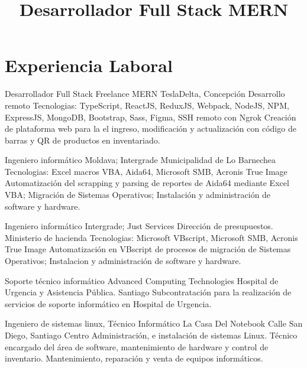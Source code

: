 \documentclass[draft,color,12pt,letterpaper,sans]{moderncv}
\title{Desarrollador Full Stack MERN}
\begin{document}
\makecvtitle %

\section{Experiencia Laboral}
{Desarrollador Full Stack Freelance MERN}
{TeslaDelta, Concepci\'on}
{\newline Desarrollo remoto}
{\newline Tecnologias: TypeScript, ReactJS, ReduxJS, Webpack, NodeJS, NPM, ExpressJS, MongoDB, Bootstrap, Sass, Figma, SSH remoto con Ngrok}
{Creaci\'on de plataforma web para la el ingreso, modificaci\'on y actualizaci\'on con c\'odigo de barras y QR de productos en inventariado.\newline}

{Ingeniero inform\'atico}
{Moldava; Intergrade}
{Municipalidad de Lo Barnechea}
{\newline Tecnologias: Excel macros VBA, Aida64, Microsoft SMB, Acronis True Image}
{Automatizaci\'on del scrapping y parsing de reportes de Aida64 mediante Excel VBA; Migraci\'on de Sistemas Operativos; Instalaci\'on y administraci\'on de software y hardware.\newline}


{Ingeniero inform\'atico}
{Intergrade; Just Services}
{Direcci\'on de presupuestos. Ministerio de hacienda}
{\newline Tecnologias: Microsoft VBscript, Microsoft SMB, Acronis True Image}
{Automatizaci\'on en VBscript de procesos de migraci\'on de Sistemas Operativos; Instalacion y administraci\'on de software y hardware.\newline}

{Soporte t\'ecnico inform\'atico}
{Advanced Computing Technologies}
{Hospital de Urgencia y Asistencia P\'ublica. Santiago}
{}
{Subcontrataci\'on para la realizaci\'on de servicios de soporte inform\'atico en Hospital de Urgencia.\newline}

{Ingeniero de sistemas linux, T\'ecnico Inform\'atico}
{La Casa Del Notebook}
{Calle San Diego, Santiago Centro}
{}
{Administraci\'on, e instalaci\'on de sistemas Linux. T\'ecnico encargado del \'area de software, mantenimiento de hardware y control de inventario. Mantenimiento, reparaci\'on y venta de equipos inform\'aticos.\newline} 
\end{document}
